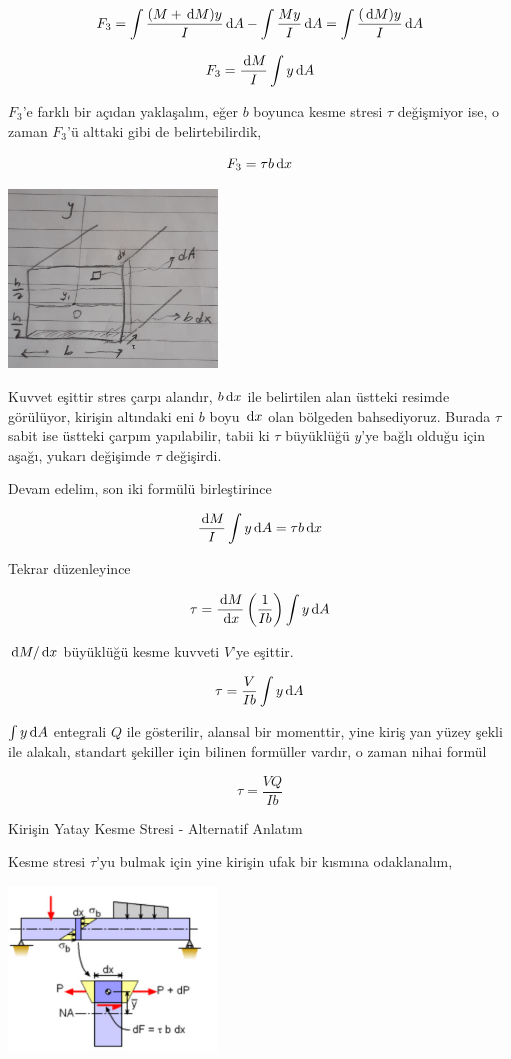 \documentclass[12pt,fleqn]{article}\usepackage{../../common}
\begin{document}
$$
F_3 = \int \frac{(M + \,\mathrm{d} M)y}{I} \,\mathrm{d} A -  \int \frac{My}{I} \,\mathrm{d} A =
\int \frac{(\,\mathrm{d} M)y}{I} \,\mathrm{d} A
$$

$$
F_3 = \frac{\,\mathrm{d} M}{I} \int y \,\mathrm{d} A
$$

$F_3$'e farklı bir açıdan yaklaşalım, eğer $b$ boyunca kesme stresi $\tau$
değişmiyor ise, o zaman $F_3$'ü alttaki gibi de belirtebilirdik,

$$
F_3 = \tau b \,\mathrm{d} x
$$

\includegraphics[width=15em]{phy_020_strs_02_05.jpg}

Kuvvet eşittir stres çarpı alandır, $b \,\mathrm{d} x$ ile belirtilen alan üstteki
resimde görülüyor, kirişin altındaki eni $b$ boyu $\,\mathrm{d} x$ olan bölgeden
bahsediyoruz. Burada $\tau$ sabit ise üstteki çarpım yapılabilir, tabii ki
$\tau$ büyüklüğü $y$'ye bağlı olduğu için aşağı, yukarı değişimde $\tau$
değişirdi.

Devam edelim, son iki formülü birleştirince

$$
\frac{\,\mathrm{d} M}{I} \int y \,\mathrm{d} A = \tau b \,\mathrm{d} x
$$

Tekrar düzenleyince

$$
\tau = \frac{\,\mathrm{d} M}{\,\mathrm{d} x} \left( \frac{1}{Ib}  \right) \int y \,\mathrm{d} A
$$

$\,\mathrm{d} M / \,\mathrm{d} x$ büyüklüğü kesme kuvveti $V$'ye eşittir. 

$$
\tau =  \frac{V}{Ib} \int y \,\mathrm{d} A
$$

$\int y \,\mathrm{d} A$ entegrali $Q$ ile gösterilir, alansal bir momenttir, yine kiriş
yan yüzey şekli ile alakalı, standart şekiller için bilinen formüller vardır, o
zaman nihai formül

$$
\tau =  \frac{VQ}{Ib}
$$

Kirişin Yatay Kesme Stresi - Alternatif Anlatım

Kesme stresi $\tau$'yu bulmak için yine kirişin ufak bir kısmına odaklanalım,

\includegraphics[width=15em]{phy_020_strs_01_05.jpg}
\end{document}
